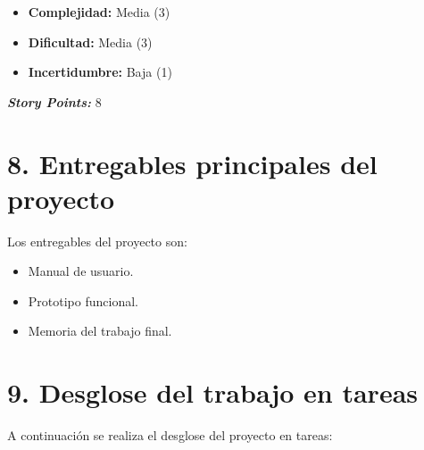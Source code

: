 \documentclass[
11pt, %
]{charter}
\begin{document}
        \begin{itemize}
            \item \textbf{Complejidad:} Media (3)
            \item \textbf{Dificultad:} Media (3)
            \item \textbf{Incertidumbre:} Baja (1)
        \end{itemize}
        \textit{\textbf{Story Points:}} 8
  

\section{8. Entregables principales del proyecto}
\label{sec:entregables}

Los entregables del proyecto son:

\begin{itemize}
	\item Manual de usuario.
	\item Prototipo funcional.
	\item Memoria del trabajo final.
\end{itemize}

\section{9. Desglose del trabajo en tareas}
\label{sec:wbs}


A continuación se realiza el desglose del proyecto en tareas:
\end{document}
